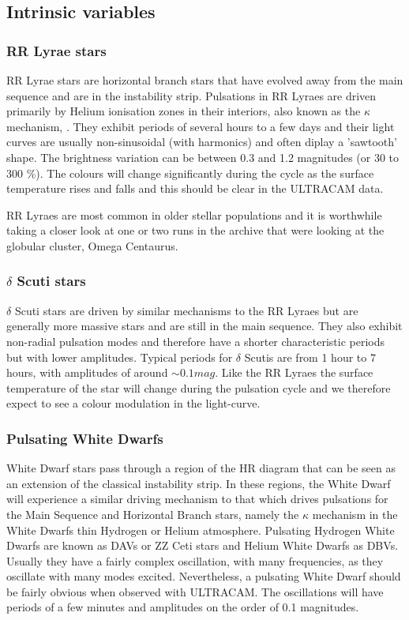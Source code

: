 \subsection{Intrinsic variables}

\subsubsection{RR Lyrae stars}
RR Lyrae stars are horizontal branch stars that have evolved away from the main sequence and are in the instability strip. Pulsations in RR Lyraes are driven primarily by Helium ionisation zones in their interiors, also known as the $\kappa$ mechanism, \cite{asteroseismology}. They exhibit periods of several hours to a few days and their light curves are usually non-sinusoidal (with harmonics) and often diplay a 'sawtooth' shape. The brightness variation can be between 0.3 and 1.2 magnitudes (or 30 to 300 \%). The colours will change significantly during the cycle as the surface temperature rises and falls and this should be clear in the ULTRACAM data. 

RR Lyraes are most common in older stellar populations and it is worthwhile taking a closer look at one or two runs in the archive that were looking at the globular cluster, Omega Centaurus. 

\subsubsection{$\delta$ Scuti stars}
$\delta$ Scuti stars are driven by similar mechanisms to the RR Lyraes but are generally more massive stars and are still in the main sequence. They also exhibit non-radial pulsation modes and therefore have a shorter characteristic periods but with lower amplitudes. Typical periods for $\delta$ Scutis are from 1 hour to 7 hours, with amplitudes of around $\sim 0.1 mag$. Like the RR Lyraes the surface temperature of the star will change during the pulsation cycle and we therefore expect to see a colour modulation in the light-curve. 

\subsubsection{Pulsating White Dwarfs}
White Dwarf stars pass through a region of the HR diagram that can be seen as an extension of the classical instability strip. In these regions, the White Dwarf will experience a similar driving mechanism to that which drives pulsations for the Main Sequence and Horizontal Branch stars, namely the $\kappa$ mechanism in the White Dwarfs thin Hydrogen or Helium atmosphere. Pulsating Hydrogen White Dwarfs are known as {DAVs} or {ZZ Ceti} stars and Helium White Dwarfs as {DBV}s. Usually they have a fairly complex oscillation, with many frequencies, as they oscillate with many modes excited. Nevertheless, a pulsating White Dwarf should be fairly obvious when observed with ULTRACAM. The oscillations will have periods of a few minutes and amplitudes on the order of 0.1 magnitudes. 

